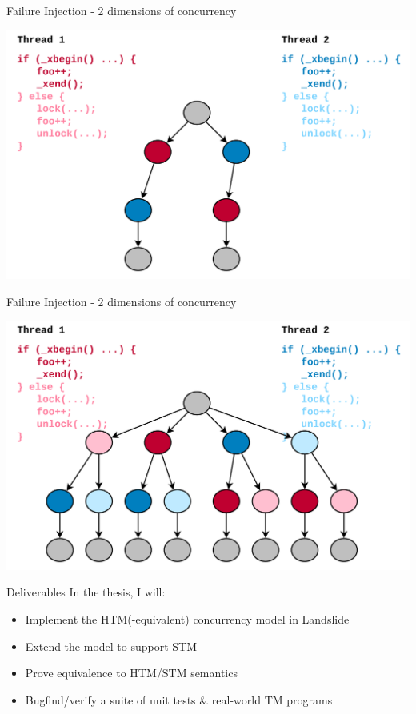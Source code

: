 \documentclass[xcolor=dvipsnames]{beamer}
\begin{document}
\begin{frame}{Failure Injection - 2 dimensions of concurrency}
	\begin{center}
		\includegraphics[width=\textwidth]{failure-injection-0.pdf}
	\end{center}
\end{frame}
\begin{frame}{Failure Injection - 2 dimensions of concurrency}
	\begin{center}
		\includegraphics[width=\textwidth]{failure-injection-2.pdf}
	\end{center}
\end{frame}

\begin{frame}{Deliverables}
	In the thesis, I will:
	\begin{itemize}
		\item Implement the HTM(-equivalent) concurrency model in Landslide
		\item Extend the model to support STM
		\item Prove equivalence to HTM/STM semantics %
		\item Bugfind/verify a suite of unit tests \& real-world TM programs
	\end{itemize}
\end{frame}
\end{document}
